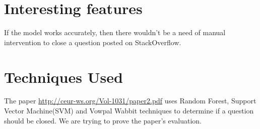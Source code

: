 \documentclass[11pt]{exam}
\begin{document}
\section{Interesting features}

If the model works accurately, then there wouldn't be a need of manual intervention to close a question posted on StackOverflow. 

\section{Techniques Used}

The paper \url{http://ceur-ws.org/Vol-1031/paper2.pdf} uses Random Forest, Support Vector Machine(SVM) and Vowpal Wabbit techniques to determine if a question should be closed. We are trying to prove the paper's evaluation.
\end{document}

